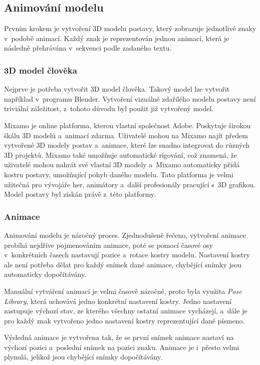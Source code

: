 \documentclass[
  master,
  program=ainfvs,
  biblatex,
  figures=true,
  tables=false,
  sourcecodes=true,
  glossaries,
  index
]{kidiplom}
\begin{document}
      
    \subsection{Animování modelu}
        Prvním krokem je vytvoření 3D modelu postavy, který zobrazuje jednotlivé znaky v~podobě animací. Každý znak je reprezentován jednou animací, která je následně přehrávána v~sekvenci podle zadaného textu.

        \subsubsection{3D model člověka}
            Nejprve je potřeba vytvořit 3D model člověka. Takový model lze vytvořit například v~programu Blender. Vytvoření vizuálně zdařilého modelu postavy není triviální záležitost, z~tohoto důvodu byl použit již vytvořený model.

            Mixamo \cite{mixamo} je online platforma, kterou vlastní společnost Adobe. Poskytuje širokou škálu 3D modelů a~animací zdarma. Uživatelé mohou na Mixamo najít předem vytvořené 3D modely postav a~animace, které lze snadno integrovat do různých 3D projektů. Mixamo také umožňuje automatické rigování, což znamená, že uživatelé mohou nahrát své vlastní 3D modely a~Mixamo automaticky přidá kostru postavy, umožňující pohyb daného modelu. Tato platforma je velmi užitečná pro vývojáře her, animátory a~další profesionály pracující s~3D grafikou. Model postavy byl získán právě z~této platformy. 
            
    
        \subsubsection{Animace}
            Animování modelu je náročný proces. Zjednodušeně řečeno, vytvoření animace probíhá nejdříve pojmenováním animace, poté se pomocí časové osy v~konkrétních časech nastavují pozice a~rotace kostry modelu. Nastavení kostry ale není potřeba dělat pro každý snímek dané animace, chybějící snímky jsou automaticky dopočítávány.

            Manuální vytváření animací je velmi časově náročné, proto byla využita \emph{Pose Library}, která uchovává jedno konkrétní nastavení kostry. Jedno nastavení zastupuje výchozí stav, ze kterého všechny ostatní animace vycházejí, a~dále je pro každý znak vytvořeno jedno nastavení kostry reprezentující dané písmeno. 
            
            Výsledná animace je vytvořena tak, že se první snímek animace nastaví na výchozí pozici a~poslední snímek na pozici znaku. Animace je i~přesto velmi plynulá, jelikož jsou chybějící snímky dopočítávány. 
            
\end{document}
